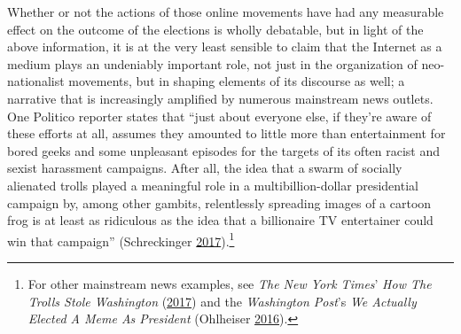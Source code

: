 \documentclass[10pt,british,A4paper,oneside]{memoir}
\begin{document}
Whether or not the actions of those online movements have had any
measurable effect on the outcome of the elections is wholly debatable,
but in light of the above information, it is at the very least sensible
to claim that the Internet as a medium plays an undeniably important role,
not just in the organization of neo-nationalist movements, but in
shaping elements of its discourse as well; a narrative that is
increasingly amplified by numerous mainstream news outlets. One Politico
reporter states that ``just about everyone else, if they're aware of
these efforts at all, assumes they amounted to little more than
entertainment for bored geeks and some unpleasant episodes for the
targets of its often racist and sexist harassment campaigns. After all,
the idea that a swarm of socially alienated trolls played a meaningful
role in a multibillion-dollar presidential campaign by, among other
gambits, relentlessly spreading images of a cartoon frog is at least as
ridiculous as the idea that a billionaire TV entertainer could win that
campaign'' (Schreckinger
\protect\hyperlink{ref-schreckinger_world_2017}{2017}).\footnote{For
  other mainstream news examples, see \emph{The New York Times}'
  \emph{How The Trolls Stole Washington}
  (\protect\hyperlink{ref-hess_how_2017}{2017}) and the \emph{Washington
  Post}'s \emph{We Actually Elected A Meme As President} (Ohlheiser
  \protect\hyperlink{ref-ohlheiser_analysis_2016}{2016}).}
\end{document}
